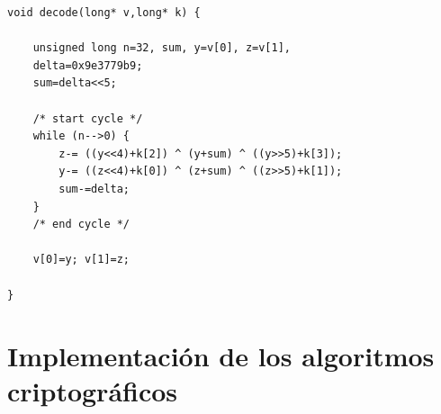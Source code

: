 \begin{lstlisting}[caption=Código en C del paso de descifrado en el algoritmo TEA \citep{tea}, label={lstDecipherTEA}, mathescape]
void decode(long* v,long* k) {

	unsigned long n=32, sum, y=v[0], z=v[1],
	delta=0x9e3779b9;
	sum=delta<<5;

	/* start cycle */
	while (n-->0) {
		z-= ((y<<4)+k[2]) ^ (y+sum) ^ ((y>>5)+k[3]);
		y-= ((z<<4)+k[0]) ^ (z+sum) ^ ((z>>5)+k[1]);
		sum-=delta; 
	}
	/* end cycle */
	
	v[0]=y; v[1]=z; 

}
\end{lstlisting}



\chapter{Implementación de los algoritmos criptográficos}

